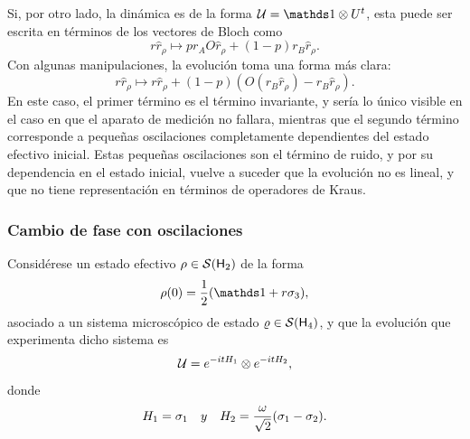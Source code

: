 Si, por otro lado, la dinámica es de la forma $\mcU=\Id\otimes U^{t}$, esta puede ser escrita en términos de los vectores de Bloch como
\begin{equation*}
    r\hat{r}_{\rho}\mapsto pr_{A}O\hat{r}_{\rho}+(1-p)r_{B}\hat{r}_{\rho}.
\end{equation*}
Con algunas manipulaciones, la evolución toma una forma más clara:
\begin{equation*}
    r\hat{r}_{\rho}\mapsto r\hat{r}_{\rho}+(1-p)(O(r_{B}\hat{r}_{\rho})-r_{B}\hat{r}_{\rho}).
\end{equation*}
En este caso, el primer término es el término invariante, y sería lo único visible en el caso en que el aparato de medición no fallara, mientras que el segundo término corresponde a pequeñas oscilaciones completamente dependientes del estado efectivo inicial. Estas pequeñas oscilaciones son el término de ruido, y por su dependencia en el estado inicial, vuelve a suceder que la evolución no es lineal, y que no tiene representación en términos de operadores de Kraus.

\subsubsection{Cambio de fase con oscilaciones}

Considérese un estado efectivo $\rho\in\mathcal{S}({\sf H}_{2})$ de la forma
\begin{equation*}
    \rho(0)=\frac{1}{2}(\Id+r\pauli{3}),
\end{equation*}
asociado a un sistema microscópico de estado $\varrho\in\mathcal{S}({\sf H}_{4})$, y que la evolución que experimenta dicho sistema es
\begin{equation*}
    \mathcal{U}=e^{-itH_{1}}\otimes e^{-itH_{2}},
\end{equation*}
donde
\begin{align*}
    H_{1}=\sigma_{1} & & y & &H_{2}=\frac{\omega}{\sqrt{2}}(\sigma_{1}-\sigma_{2}).
\end{align*}

